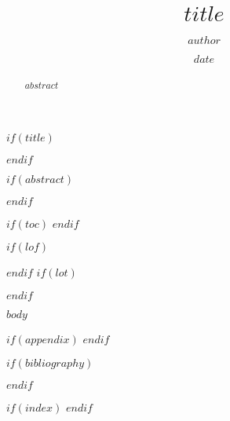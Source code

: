 \documentclass[$if(fontsize)$fontsize=$fontsize$,$endif$$if(papersize)$papersize=$papersize$,$endif$$if(classoption)$$classoption$,$endif$]{$documentclass$}
\title{$title$}
\author{$author$}
\date{$date$}
\date{} %
\newcommand\$variable$$value$
\begin{document}
$if(title)$
\maketitle
$endif$

$if(abstract)$
\begin{abstract}
$abstract$
\end{abstract}
$endif$

$if(toc)$
\clearpage
\tableofcontents
$endif$

$if(lof)$
\listoffigures
$endif$
$if(lot)$
\listoftables
$endif$

$body$

$if(appendix)$
\appendix
$endif$

$if(bibliography)$

$endif$

$if(index)$
\printindex
$endif$

\end{document}
